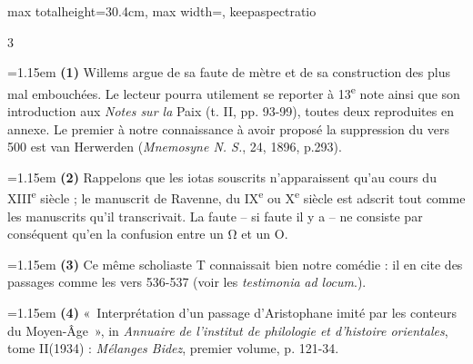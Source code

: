 \documentclass[11pt,twoside]{book}
\newcommand{\currHeadLE}{}
\newcommand{\currHeadRE}{}
\newcommand{\currHeadLO}{}
\newcommand{\currHeadRO}{}
\newcommand{\italique}[1]{\textit{#1}}
\newcommand{\nieme}[1]{#1\textsuperscript{e}}
\newcommand{\R}{\textbf{R}}
\newcommand{\latin}[1]{\textit{#1}}
\begin{document}
\begin{adjustbox}{max totalheight=30.4cm, max width=\textwidth, keepaspectratio}
\begin{minipage}{\textwidth}
{\begin{multicols}{3}
\par\vspace{1.5pt}
\par\vspace{1.2pt}\par\nopagebreak\vspace{1pt}\noindent\hangindent=1.15em {\color{sepiaNote}\textbf{(1)}} Willems argue de sa faute de mètre et de sa construction des plus mal embouchées. Le lecteur pourra utilement se reporter à \nieme{13} note ainsi que son introduction aux \italique{Notes sur la} Paix (t. II, pp. 93-99), toutes deux reproduites en annexe. Le premier à notre connaissance à avoir proposé la suppression du vers 500 est van Herwerden (\italique{Mnemosyne N. S.}, 24, 1896, p.293).
\par\vspace{1.5pt}
\noindent\hangindent=1.15em {\color{sepiaNote}\textbf{(2)}} Rappelons que les iotas souscrits n'apparaissent qu'au cours du \nieme{XIII} siècle ; le manuscrit de Ravenne, du \nieme{IX} ou \nieme{X} siècle est adscrit tout comme les manuscrits qu'il transcrivait. La faute -- si faute il y a -- ne consiste par conséquent qu'en la confusion entre un Ω et un Ο.
\par\vspace{1.5pt}
\noindent\hangindent=1.15em {\color{sepiaNote}\textbf{(3)}} Ce même scholiaste T connaissait bien notre comédie : il en cite des passages comme les vers 536-537 (voir les \latin{testimonia} \italique{ad locum}.).
\par\vspace{1.5pt}
\noindent\hangindent=1.15em {\color{sepiaNote}\textbf{(4)}} «~Interprétation d'un passage d'Aristophane imité par les conteurs du Moyen-Âge~», in \italique{Annuaire de l'institut de philologie et d'histoire orientales}, tome II(1934) : \italique{Mélanges Bidez}, premier volume, p. 121-34.
\par\end{multicols}}
\end{minipage}\end{adjustbox}
\clearpage\ifodd\value{page}\hbox{}\newpage\fi
\renewcommand{\currHeadLE}{ΑΡΙΣΤΟΦΑΝΟΥΣ ΘΕΣΜΟΦΟΡΙΑΖΟΥΣΑΙ · CODEX RAVENNAS 429 (\R)}
\renewcommand{\currHeadRE}{Folio f. 168v (Classense 170v) · vv. 509–550}
\renewcommand{\currHeadLO}{FAC-SIMILÉ DU CODEX RAVENNAS 429 (\R) · f. 168v (Classense 170v)}
\renewcommand{\currHeadRO}{vv. 509–550 · Planche recadrée sur la zone écrite et harmonisée}
\end{document}
